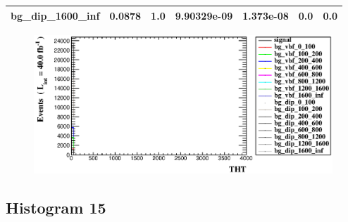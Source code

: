 \documentclass[a4paper, 10pt]{article}
\begin{document}
\begin{table}[H]
\begin{center}
\begin{tabular}{|m{23.0mm}|m{23.0mm}|m{18.0mm}|m{19.0mm}|m{19.0mm}|m{19.0mm}|m{19.0mm}|}
      \hline
      {\cellcolor{white}         bg\_dip\_1600\_inf}& {\cellcolor{white}         0.0878}& {\cellcolor{white}         1.0}& {\cellcolor{white}         9.90329e-09}& {\cellcolor{white}         1.373e-08}& {\cellcolor{green}         0.0}& {\cellcolor{green}         0.0}\\
\hline
    \end{tabular}
  \end{center}
\end{table}

\begin{figure}[H]
  \begin{center}
    \includegraphics[scale=0.45]{selection_13.eps}\\
\caption{   }
  \end{center}
\end{figure}
      \newpage
\subsection{ Histogram 15}
\end{document}
